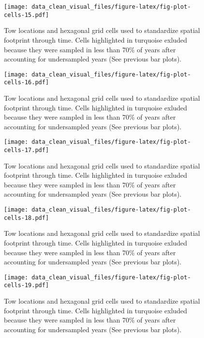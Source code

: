 \documentclass[
]{article}
\begin{document}
\begin{figure}
\centering
\texttt{[image: data\_clean\_visual\_files/figure-latex/fig-plot-cells-15.pdf]}
\caption{\label{fig:fig-plot-cells-15}Tow locations and hexagonal grid cells used to standardize spatial footprint through time. Cells highlighted in turquoise exluded because they were sampled in less than 70\% of years after accounting for undersampled years (See previous bar plots).}
\end{figure}

\begin{figure}
\centering
\texttt{[image: data\_clean\_visual\_files/figure-latex/fig-plot-cells-16.pdf]}
\caption{\label{fig:fig-plot-cells-16}Tow locations and hexagonal grid cells used to standardize spatial footprint through time. Cells highlighted in turquoise exluded because they were sampled in less than 70\% of years after accounting for undersampled years (See previous bar plots).}
\end{figure}

\begin{figure}
\centering
\texttt{[image: data\_clean\_visual\_files/figure-latex/fig-plot-cells-17.pdf]}
\caption{\label{fig:fig-plot-cells-17}Tow locations and hexagonal grid cells used to standardize spatial footprint through time. Cells highlighted in turquoise exluded because they were sampled in less than 70\% of years after accounting for undersampled years (See previous bar plots).}
\end{figure}

\begin{figure}
\centering
\texttt{[image: data\_clean\_visual\_files/figure-latex/fig-plot-cells-18.pdf]}
\caption{\label{fig:fig-plot-cells-18}Tow locations and hexagonal grid cells used to standardize spatial footprint through time. Cells highlighted in turquoise exluded because they were sampled in less than 70\% of years after accounting for undersampled years (See previous bar plots).}
\end{figure}

\begin{figure}
\centering
\texttt{[image: data\_clean\_visual\_files/figure-latex/fig-plot-cells-19.pdf]}
\caption{\label{fig:fig-plot-cells-19}Tow locations and hexagonal grid cells used to standardize spatial footprint through time. Cells highlighted in turquoise exluded because they were sampled in less than 70\% of years after accounting for undersampled years (See previous bar plots).}
\end{figure}
\end{document}
